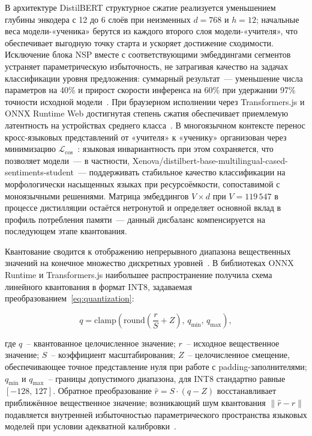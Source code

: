 В архитектуре DistilBERT структурное сжатие реализуется уменьшением глубины энкодера с 12 до 6 слоёв при неизменных $d = 768$ и $h = 12$; начальные веса модели-«ученика» берутся из каждого второго слоя модели-«учителя», что обеспечивает выгодную точку старта и ускоряет достижение сходимости. Исключение блока NSP вместе с соответствующими эмбеддингами сегментов устраняет параметрическую избыточность, не затрагивая качество на задачах классификации уровня предложения: суммарный результат~— уменьшение числа параметров на 40\% и прирост скорости инференса на 60\% при удержании 97\% точности исходной модели~\cite{sanh2019distilbert}. При браузерном исполнении через Transformers.js и ONNX Runtime Web достигнутая степень сжатия обеспечивает приемлемую латентность на устройствах среднего класса~\cite{wang2024anatomizing}. В многоязычном контексте перенос кросс-языковых представлений от «учителя» к «ученику» организован через минимизацию $\mathcal{L}_{\mathrm{cos}}$~\cite{xu2024distillation}: языковая инвариантность при этом сохраняется, что позволяет модели~— в частности, Xenova/distilbert-base-multilingual-cased-sentiments-student~— поддерживать стабильное качество классификации на морфологически насыщенных языках при ресурсоёмкости, сопоставимой с моноязычными решениями. Матрица эмбеддингов $V \times d$ при $V = 119\,547$ в процессе дистилляции остаётся нетронутой и определяет основной вклад в профиль потребления памяти~— данный дисбаланс компенсируется на последующем этапе квантования.

Квантование сводится к отображению непрерывного диапазона вещественных значений на конечное множество дискретных уровней~\cite{gholami2021quantization}. В библиотеках ONNX Runtime и Transformers.js наибольшее распространение получила схема линейного квантования в формат INT8, задаваемая преобразованием~\eqref{eq:quantization}:

\begin{equation}
    q = \mathrm{clamp}\!\left(\mathrm{round}\!\left(\frac{r}{S} + Z\right),\, q_{\min},\, q_{\max}\right),
    \label{eq:quantization}
\end{equation}

\noindent где $q$~– квантованное целочисленное значение; $r$~– исходное вещественное значение; $S$~– коэффициент масштабирования; $Z$~– целочисленное смещение, обеспечивающее точное представление нуля при работе с padding-заполнителями; $q_{\min}$ и $q_{\max}$~– границы допустимого диапазона, для INT8 стандартно равные $[-128,\, 127]$. Обратное преобразование $\hat{r} = S \cdot (q - Z)$ восстанавливает приближённое вещественное значение; возникающий шум квантования $\|\hat{r} - r\|$ подавляется внутренней избыточностью параметрического пространства языковых моделей при условии адекватной калибровки~\cite{dettmers2022llmint8}.

